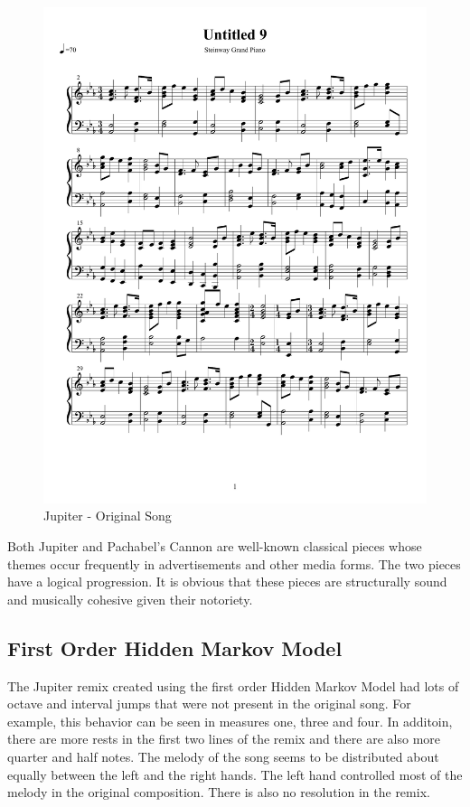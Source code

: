 \documentclass{article} %
\begin{document}
\begin{figure}[H]
\centering
\caption{Jupiter - Original Song}
\includegraphics [scale = 0.6] {JupiterOriginal-cropped.pdf}
\end{figure}

Both Jupiter and Pachabel's Cannon are well-known classical pieces whose themes occur frequently in advertisements and other media forms. The two pieces have a logical progression. It is obvious that these pieces are structurally sound and musically cohesive given their notoriety. 

\subsection{First Order Hidden Markov Model}

The Jupiter remix created using the first order Hidden Markov Model had lots of octave and interval jumps that were not present in the original song. For example, this behavior can be seen in measures one, three and four. In additoin, there are more rests in the first two lines of the remix and there are also more quarter and half notes. The melody of the song seems to be distributed about equally between the left and the right hands. The left hand controlled most of the melody in the original composition. There is also no resolution in the remix.
\end{document}
